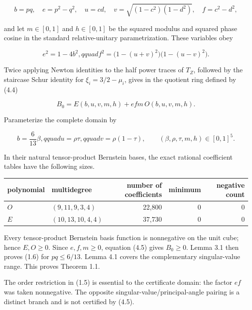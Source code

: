 \documentclass[11pt]{article}
\begin{document}
\begin{equation}
b=pq,\quad e=p^2-q^2,\quad u=cd,\quad
v=\sqrt{(1-c^2)(1-d^2)},\quad f=c^2-d^2,
\tag{4.3}
\end{equation}

and let $m\in[0,1]$ and $h\in[0,1]$ be the squared modulus and squared phase cosine in the standard relative-unitary parametrization. These variables obey

\begin{equation}
e^2=1-4b^2,qquad
f^2=\bigl(1-(u+v)^2\bigr)\bigl(1-(u-v)^2\bigr).
\tag{4.4}
\end{equation}

Twice applying Newton identities to the half power traces of $T_Z$, followed by the staircase Schur identity for $\xi_i=3/2-\mu_i$, gives in the quotient ring defined by (4.4)

\begin{equation}
B_0=E(b,u,v,m,h)+efm\,O(b,u,v,m,h).
\tag{4.5}
\end{equation}

Parameterize the complete domain by

\begin{equation}
b=\frac6{13}\beta,qquad
u=\rho\tau,qquad v=\rho(1-\tau),
\qquad (\beta,\rho,\tau,m,h)\in[0,1]^5.
\tag{4.6}
\end{equation}

In their natural tensor-product Bernstein bases, the exact rational coefficient tables have the following sizes.

\begin{center}
\begin{tabularx}{\textwidth}{@{}Y Y R R R@{}}
\toprule
polynomial & multidegree & number of coefficients & minimum & negative count \\
\midrule
$O$ & $(9,11,9,3,4)$ & 22,800 & $0$ & $0$ \\
$E$ & $(10,13,10,4,4)$ & 37,730 & $0$ & $0$ \\
\bottomrule
\end{tabularx}
\end{center}

Every tensor-product Bernstein basis function is nonnegative on the unit cube; hence $E,O\ge0$. Since $e,f,m\ge0$, equation (4.5) gives $B_0\ge0$. Lemma 3.1 then proves (1.6) for $pq\le6/13$. Lemma 4.1 covers the complementary singular-value range. This proves Theorem 1.1.

The order restriction in (1.5) is essential to the certificate domain: the factor $ef$ was taken nonnegative. The opposite singular-value/principal-angle pairing is a distinct branch and is not certified by (4.5).
\end{document}
